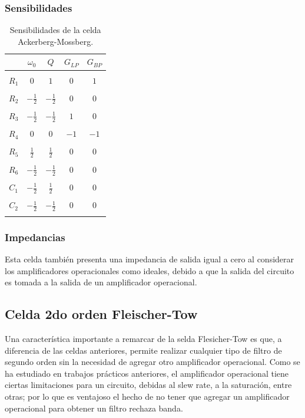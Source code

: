 \subsubsection{Sensibilidades}

\begin{table}[H]
	\centering
	\begin{tabular}{c c c c c }
		& $\omega_0$ & $Q$ &$G_{LP}$ & $G_{BP}$\\
		\hline \\
		$R_1$ & $0$ & $1$ & $0$ & $1$\\ \\
		$R_2$ & $-\frac{1}{2}$ & $-\frac{1}{2}$ & $0$ & $0$\\ \\
		$R_3$ & $-\frac{1}{2}$ & $-\frac{1}{2}$ & $1$ & $0$ \\ \\
		$R_4$ & $0$ & $0$ & $-1$ & $-1$ \\ \\
		$R_5$ & $\frac{1}{2}$ & $\frac{1}{2}$ & $0$ & $0$ \\ \\
		$R_6$ & $-\frac{1}{2}$ & $-\frac{1}{2}$ & $0$ & $0$ \\ \\
		$C_1$ & $-\frac{1}{2} $ & $\frac{1}{2}$ & $0$ & $0$\\ \\
		$C_2$ & $-\frac{1}{2}$ & $-\frac{1}{2}$ & $0$ & $0$\\ \\
		\hline
	\end{tabular}
	\caption{Sensibilidades de la celda Ackerberg-Mossberg.}
	\label{sens_am}
\end{table}


\subsubsection{Impedancias}
Esta celda tambi\'en presenta una impedancia de salida igual a cero al considerar los amplificadores operacionales como ideales, debido a que la salida del circuito es tomada a la salida de un amplificador operacional.

\subsection{Celda 2do orden Fleischer-Tow}

Una caracter\'istica importante a remarcar de la selda Flesicher-Tow es que, a diferencia de las celdas anteriores, permite realizar cualquier tipo de filtro de segundo orden sin la necesidad de agregar otro amplificador operacional. Como se ha estudiado en trabajos pr\'acticos anteriores, el amplificador operacional tiene ciertas limitaciones para un circuito, debidas al slew rate, a la saturaci\'on, entre otras; por lo que es ventajoso el hecho de no tener que agregar un amplificador operacional para obtener un filtro rechaza banda.


